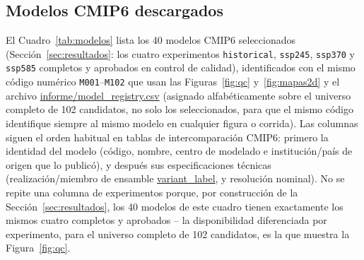 \documentclass[11pt,a4paper]{article}
\newcommand{\archivo}[1]{\begingroup\hypersetup{urlcolor=black}\url{#1}\endgroup}
\begin{document}
\subsection{Modelos CMIP6 descargados}
\label{sec:tabla_modelos}

El Cuadro~\ref{tab:modelos} lista los 40 modelos CMIP6 seleccionados (Secci\'on~\ref{sec:resultados}: los cuatro experimentos \texttt{historical}, \texttt{ssp245}, \texttt{ssp370} y \texttt{ssp585} completos y aprobados en control de calidad), identificados con el mismo c\'odigo num\'erico \texttt{M001}--\texttt{M102} que usan las Figuras~\ref{fig:qc} y~\ref{fig:mapas2d} y el archivo \archivo{informe/model\_registry.csv} (asignado alfab\'eticamente sobre el universo completo de 102 candidatos, no solo los seleccionados, para que el mismo c\'odigo identifique siempre al mismo modelo en cualquier figura o corrida). Las columnas siguen el orden habitual en tablas de intercomparaci\'on CMIP6: primero la identidad del modelo (c\'odigo, nombre, centro de modelado e instituci\'on/pa\'is de origen que lo public\'o), y despu\'es sus especificaciones t\'ecnicas (realizaci\'on/miembro de ensamble \archivo{variant\_label}, y resoluci\'on nominal). No se repite una columna de experimentos porque, por construcci\'on de la Secci\'on~\ref{sec:resultados}, los 40 modelos de este cuadro tienen exactamente los mismos cuatro completos y aprobados -- la disponibilidad diferenciada por experimento, para el universo completo de 102 candidatos, es la que muestra la Figura~\ref{fig:qc}.
\end{document}
